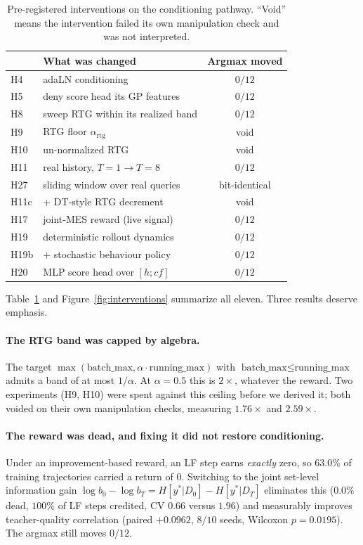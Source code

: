 \documentclass[11pt]{article}
\begin{document}
\begin{table}[t]\centering
\caption{Pre-registered interventions on the conditioning pathway. ``Void''
means the intervention failed its own manipulation check and was not
interpreted.}
\label{tab:interventions}
\begin{tabular}{llc}
\toprule
& What was changed & Argmax moved \\
\midrule
H4  & adaLN conditioning \citep{peebles2023dit,wang2026ddt} & $0/12$ \\
H5  & deny score head its GP features & $0/12$ \\
H8  & sweep RTG within its realized band & $0/12$ \\
H9  & RTG floor $\alpha_{\mathrm{rtg}}$ & void \\
H10 & un-normalized RTG & void \\
H11 & real history, $T{=}1 \rightarrow T{=}8$ & $0/12$ \\
H27 & sliding window over real queries & bit-identical \\
H11c& + DT-style RTG decrement & void \\
H17 & joint-MES reward (live signal) & $0/12$ \\
H19 & deterministic rollout dynamics & $0/12$ \\
H19b& + stochastic behaviour policy & $0/12$ \\
H20 & MLP score head over $[h;\mathit{cf}]$ & $0/12$ \\
\bottomrule
\end{tabular}
\end{table}

Table~\ref{tab:interventions} and Figure~\ref{fig:interventions} summarize all
eleven. Three results deserve emphasis.

\paragraph{The RTG band was capped by algebra.} The target
$\max(\text{batch\_max}, \alpha\cdot\text{running\_max})$ with
$\text{batch\_max}\le\text{running\_max}$ admits a band of at most $1/\alpha$.
At $\alpha{=}0.5$ this is $2\times$, whatever the reward. Two experiments (H9,
H10) were spent against this ceiling before we derived it; both voided on their
own manipulation checks, measuring $1.76\times$ and $2.59\times$.

\paragraph{The reward was dead, and fixing it did not restore conditioning.}
Under an improvement-based reward, an LF step earns \emph{exactly} zero, so
$63.0\%$ of training trajectories carried a return of $0$. Switching to the
joint set-level information gain
$\log b_0 - \log b_T = H[y^\ast|D_0]-H[y^\ast|D_T]$ eliminates this ($0.0\%$
dead, $100\%$ of LF steps credited, CV $0.66$ versus $1.96$) and measurably
improves teacher-quality correlation (paired $+0.0962$, $8/10$ seeds, Wilcoxon
$p{=}0.0195$). The argmax still moves $0/12$.
\end{document}
